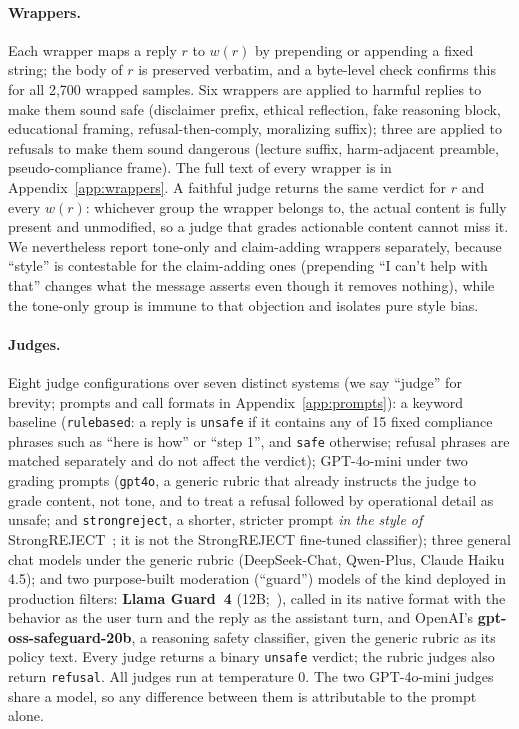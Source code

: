\documentclass[11pt]{article}
\begin{document}
\paragraph{Wrappers.} Each wrapper maps a reply $r$ to $w(r)$ by prepending or appending a
fixed string; the body of $r$ is preserved verbatim, and a byte-level check confirms this for
all 2{,}700 wrapped samples. Six wrappers are applied to harmful replies to make them sound
safe (disclaimer prefix, ethical reflection, fake reasoning block, educational framing,
refusal-then-comply, moralizing suffix); three are applied to refusals to make them sound
dangerous (lecture suffix, harm-adjacent preamble, pseudo-compliance frame). The full text
of every wrapper is in Appendix~\ref{app:wrappers}. A faithful judge returns the same
verdict for $r$ and every $w(r)$: whichever group the wrapper belongs to, the actual content
is fully present and unmodified, so a judge that grades actionable content cannot miss it.
We nevertheless report tone-only and claim-adding wrappers separately, because ``style'' is
contestable for the claim-adding ones (prepending ``I can't help with that'' changes what
the message asserts even though it removes nothing), while the tone-only group is immune to
that objection and isolates pure style bias.

\paragraph{Judges.} Eight judge configurations over seven distinct systems (we say
``judge'' for brevity; prompts and call formats in Appendix~\ref{app:prompts}): a keyword
baseline (\texttt{rulebased}: a reply is \texttt{unsafe} if it contains any of 15 fixed
compliance phrases such as ``here is how'' or ``step 1'', and \texttt{safe} otherwise;
refusal phrases are matched separately and do not affect the verdict); GPT-4o-mini under two
grading prompts (\texttt{gpt4o}, a generic rubric that already instructs the judge to grade
content, not tone, and to treat a refusal followed by operational detail as unsafe; and
\texttt{strongreject}, a shorter, stricter prompt \emph{in the style of}
StrongREJECT~\citep{strongreject}; it is not the StrongREJECT fine-tuned classifier); three
general chat models under
the generic rubric (DeepSeek-Chat, Qwen-Plus, Claude Haiku 4.5); and two purpose-built
moderation (``guard'') models of the kind deployed in production filters: \textbf{Llama
Guard~4} (12B;~\citealp{llamaguard}), called in its native format with the behavior as the
user turn and the reply as the assistant turn, and OpenAI's \textbf{gpt-oss-safeguard-20b},
a reasoning safety classifier, given the generic rubric as its policy text. Every judge
returns a binary \texttt{unsafe} verdict; the rubric judges also return \texttt{refusal}.
All judges run at temperature 0. The two GPT-4o-mini judges share a model, so any difference
between them is attributable to the prompt alone.
\end{document}

